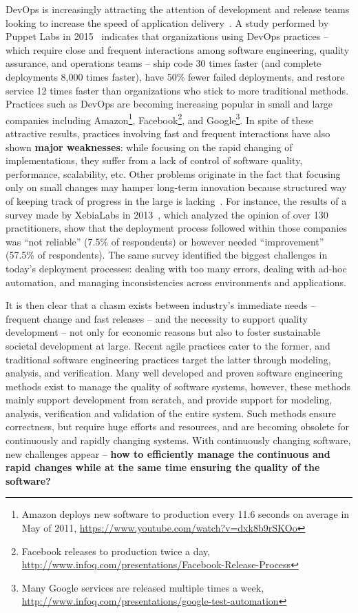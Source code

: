 \documentclass[12pt]{article}
\begin{document}
DevOps is increasingly attracting the attention of development and release teams looking to increase the speed of application delivery~\cite{Bass2015}.
A study performed by Puppet Labs in 2015~\cite{PuppetLab2015} indicates that organizations using DevOps practices -- which require close and frequent interactions among software engineering, quality assurance, and operations teams -- ship code 30 times faster (and complete deployments 8,000 times faster), have 50\% fewer failed deployments, and restore service 12 times faster than organizations who stick to more traditional methods.
Practices such as DevOps are becoming increasing popular in small and large companies including Amazon\footnote{Amazon deploys new software to production every 11.6 seconds on average in May of 2011, \url{https://www.youtube.com/watch?v=dxk8b9rSKOo}}, Facebook\footnote{Facebook releases to production twice a day, \url{http://www.infoq.com/presentations/Facebook-Release-Process}}, and Google\footnote{Many Google services are released multiple times a week, \url{http://www.infoq.com/presentations/google-test-automation}}. 
In spite of these attractive results, practices involving fast and frequent interactions have also shown {\bf major weaknesses}: while focusing on the rapid changing of implementations, they suffer from a lack of control of software quality, performance, scalability, etc.
Other problems originate in the fact that focusing only on small changes may hamper long-term innovation because structured way of keeping track of progress in the large is lacking~\cite{TurkFR14a}.
For instance, the results of a survey made by XebiaLabs in 2013~\cite{Bass2015}, which analyzed the opinion of over 130 practitioners, show that the deployment process followed within those companies was ``not reliable'' (7.5\% of respondents) or however needed ``improvement'' (57.5\% of respondents).
The same survey identified the biggest challenges in today's deployment processes: dealing with too many errors, dealing with ad-hoc automation, and managing inconsistencies across environments and applications.

It is then clear that a chasm exists between industry's immediate needs -- frequent change and fast releases -- and the necessity to support quality development -- not only for economic reasons but also to foster sustainable societal development at large.
Recent agile practices cater to the former, and traditional software engineering practices target the latter through modeling, analysis, and verification. Many well developed and proven software engineering methods exist to manage the quality of software systems, however, these methods mainly support development from scratch, and provide support for modeling, analysis, verification and validation of the entire system. Such methods ensure
correctness, but require huge efforts and resources, and are becoming obsolete for continuously and rapidly
changing systems.
With continuously changing software, new challenges appear – {\bf how to efficiently manage the continuous and rapid changes while at the same time ensuring the quality of the software?}
\end{document}
